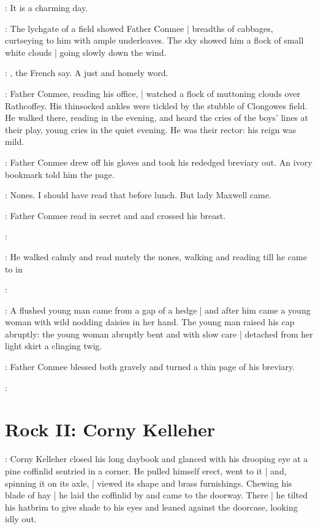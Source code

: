 \conmeeint:
It is a charming day.

:
The lychgate of a field showed Father Conmee |
breadths of cabbages,
curtseying to him with ample underleaves.
The sky showed him a flock of small white clouds |
going slowly down the wind.

\conmeeint:
, the French say.
A just and homely word.

:
Father Conmee, reading his office, |
watched a flock of muttoning clouds over Rathcoffey.
His thinsocked ankles were tickled by the stubble of Clongowes field.
He walked there, reading in the evening,
and heard the cries of the boys' lines at their play,
young cries in the quiet evening.
He was their rector: his reign was mild.

:
Father Conmee drew off his gloves
and took his rededged breviary out.
An ivory bookmark told him the page.

\conmeeint:
Nones.
I should have read that before lunch.
But lady Maxwell came.

:
Father Conmee read in secret  and 
and crossed his breast.

\conmeeint:

:
He walked calmly and read mutely the nones,
walking and reading till
he came to
 in

\conmeeint:

:
A flushed young man came from a gap of a hedge |
and after him came a young woman
with wild nodding daisies in her hand.
The young man raised his cap abruptly:
the young woman abruptly bent
and with slow care |
detached from her light skirt a clinging twig.

:
Father Conmee blessed both gravely
and turned a thin page of his breviary.

\conmeeint:


\section*{Rock II: Corny Kelleher}

:
Corny Kelleher closed his long daybook
and glanced with his drooping eye
at a pine coffinlid sentried in a corner.
He pulled himself erect,
went to it |
and, spinning it on its axle, |
viewed its shape and brass furnishings.
Chewing his blade of hay |
he laid the coffinlid by and came to the doorway.
There |
he tilted his hatbrim to give shade to his eyes
and leaned against the doorcase,
looking idly out.

